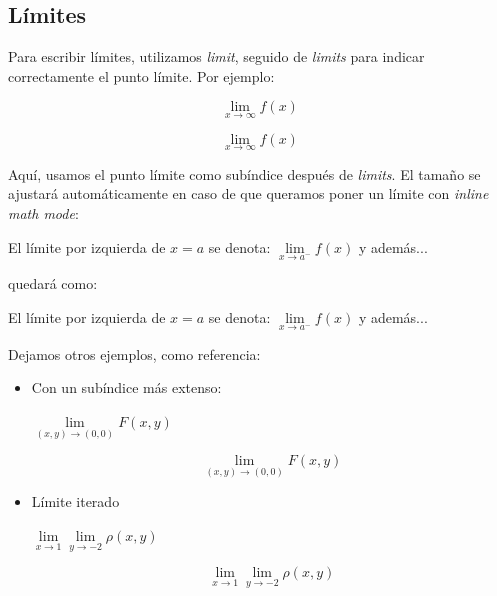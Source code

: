 \documentclass[graybox,envcountchap,sectrefs]{svmono}
\begin{document}
    \subsection{Límites}
        Para escribir límites, utilizamos \emph{limit}, seguido de \emph{limits}
        para indicar correctamente el punto límite. Por ejemplo:
        \begin{code}
            \[ \lim\limits_{x \to \infty} f(x) \]
        \end{code}
        \begin{compiled}
            \[ \lim\limits_{x \to \infty} f(x) \]
        \end{compiled}
        Aquí, usamos el punto límite como subíndice después de \emph{limits}.
        El tamaño se ajustará automáticamente en caso de que queramos poner un límite 
        con \emph{inline math mode}:

        \begin{code}
            El límite por izquierda de \(x = a\) se denota:
            \(\lim\limits_{x \to a^-} f(x)\) y además...
        \end{code}
        quedará como:

        \begin{compiled}
            El límite por izquierda de \(x = a\) se denota:
            \(\lim\limits_{x \to a^-} f(x)\) y además...
        \end{compiled}

        Dejamos otros ejemplos, como referencia:
        \begin{itemize}
            \item Con un subíndice más extenso:
    \begin{code}
        \( \lim\limits_{(x,y)\to (0,0)} F(x,y) \)
    \end{code}
    \begin{compiled}
        \[ \lim\limits_{(x,y)\to (0,0)} F(x,y) \]
    \end{compiled}

        \item Límite iterado
    \begin{code}
        \( \lim\limits_{x\to 1}\lim\limits_{y\to -2} \rho(x,y) \)
    \end{code}
    \begin{compiled}
        \[ \lim\limits_{x\to 1}\lim\limits_{y\to -2} \rho(x,y) \]
    \end{compiled}
    \end{itemize}
\end{document}
